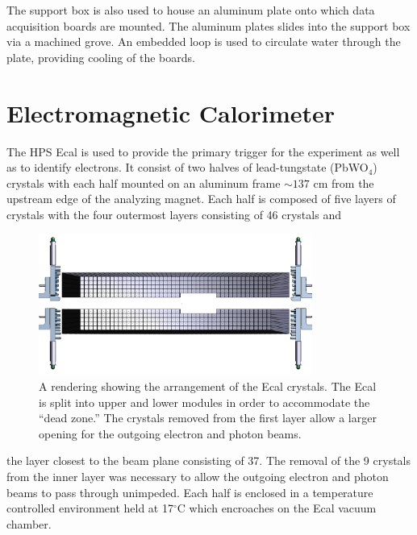 The support box is also used to house an aluminum plate onto which data 
acquisition boards are mounted.  The aluminum plates slides into the support box
via a machined grove.  An embedded loop is used to circulate water through the
plate, providing cooling of the boards.


\section{Electromagnetic Calorimeter}

The HPS Ecal is used to provide the primary trigger for the experiment as well as to
identify electrons.  It consist of two halves of lead-tungstate 
(PbWO$_4$) crystals with each half mounted on an aluminum frame $\sim 137$ cm 
from the upstream edge of the analyzing magnet.  Each half is composed of five
layers of crystals with the four outermost layers consisting of 46 crystals and 
\begin{figure}
    \centering
    \includegraphics[width=0.8\textwidth]{images/ecal_layout.png}
    \caption{A rendering showing the arrangement of the Ecal crystals.  The Ecal
             is split into upper and lower modules in order to accommodate the 
             ``dead zone.''  The crystals removed from the first layer allow
             a larger opening for the outgoing electron and photon beams.}
    \label{fig:ecal_layout}
\end{figure}
the layer closest to the beam plane consisting of 37. The removal of the 9 
crystals from the inner layer was necessary to allow the outgoing electron and
photon beams to pass through unimpeded.  Each half is enclosed in a temperature
controlled environment held at 17$^{\circ}$C which encroaches on the Ecal 
vacuum chamber.

